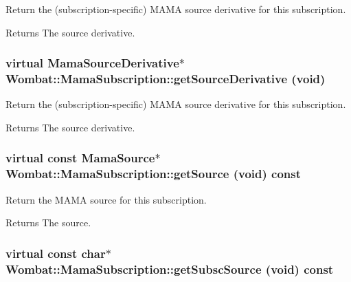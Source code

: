 Return the (subscription-\/specific) MAMA source derivative for this subscription. \begin{DoxyReturn}{Returns}
The source derivative. 
\end{DoxyReturn}
\hypertarget{classWombat_1_1MamaSubscription_a075b024887338dd46962c78101793888}{
\subsubsection[{getSourceDerivative}]{\setlength{\rightskip}{0pt plus 5cm}virtual {\bf MamaSourceDerivative}$\ast$ Wombat::MamaSubscription::getSourceDerivative (void)}}
\label{classWombat_1_1MamaSubscription_a075b024887338dd46962c78101793888}


Return the (subscription-\/specific) MAMA source derivative for this subscription. \begin{DoxyReturn}{Returns}
The source derivative. 
\end{DoxyReturn}
\hypertarget{classWombat_1_1MamaSubscription_a9a81ca79c7a43953a39a001542388b4b}{
\subsubsection[{getSource}]{\setlength{\rightskip}{0pt plus 5cm}virtual const {\bf MamaSource}$\ast$ Wombat::MamaSubscription::getSource (void) const}}
\label{classWombat_1_1MamaSubscription_a9a81ca79c7a43953a39a001542388b4b}


Return the MAMA source for this subscription. \begin{DoxyReturn}{Returns}
The source. 
\end{DoxyReturn}
\hypertarget{classWombat_1_1MamaSubscription_a4c768efb3ce3bff36c6bbe1ad8d8abb3}{
\subsubsection[{getSubscSource}]{\setlength{\rightskip}{0pt plus 5cm}virtual const char$\ast$ Wombat::MamaSubscription::getSubscSource (void) const}}
\label{classWombat_1_1MamaSubscription_a4c768efb3ce3bff36c6bbe1ad8d8abb3}


